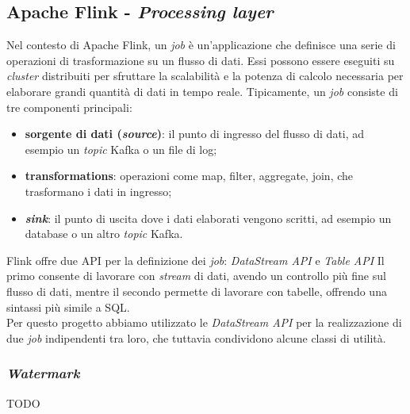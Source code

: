 \subsection{Apache Flink - \textit{Processing layer}}
Nel contesto di Apache Flink, un \textit{job} è un'applicazione che definisce una serie di operazioni di trasformazione su un flusso di dati.
Essi possono essere eseguiti su \textit{cluster} distribuiti per sfruttare la scalabilità e la potenza di calcolo necessaria per elaborare grandi quantità di dati in tempo reale.
Tipicamente, un \textit{job} consiste di tre componenti principali:
\begin{itemize}
	\item \textbf{sorgente di dati (\textit{source})}: il punto di ingresso del flusso di dati, ad esempio un \textit{topic} Kafka o un file di log;
	\item \textbf{transformations}: operazioni come map, filter, aggregate, join, che trasformano i dati in ingresso;
	\item \textbf{\textit{sink}}: il punto di uscita dove i dati elaborati vengono scritti, ad esempio un database o un altro \textit{topic} Kafka.
\end{itemize}
Flink offre due API per la definizione dei \textit{job}: \textit{DataStream API} e \textit{Table API}
Il primo consente di lavorare con \textit{stream} di dati, avendo un controllo più fine sul flusso di dati, mentre il secondo permette di lavorare con tabelle, offrendo una sintassi più simile a SQL.\\
Per questo progetto abbiamo utilizzato le \textit{DataStream API} per la realizzazione di due \textit{job} indipendenti tra loro, che tuttavia condividono alcune classi di utilità.

\subsubsection{\textit{Watermark}}\label{watermark}
TODO

